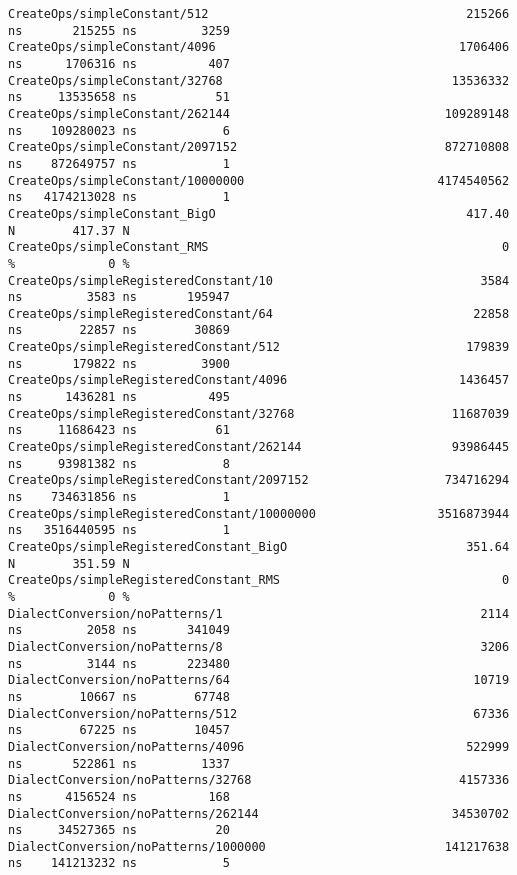 \begin{code}
\begin{verbatim}
CreateOps/simpleConstant/512                                    215266 ns       215255 ns         3259
CreateOps/simpleConstant/4096                                  1706406 ns      1706316 ns          407
CreateOps/simpleConstant/32768                                13536332 ns     13535658 ns           51
CreateOps/simpleConstant/262144                              109289148 ns    109280023 ns            6
CreateOps/simpleConstant/2097152                             872710808 ns    872649757 ns            1
CreateOps/simpleConstant/10000000                           4174540562 ns   4174213028 ns            1
CreateOps/simpleConstant_BigO                                   417.40 N        417.37 N
CreateOps/simpleConstant_RMS                                         0 %             0 %
CreateOps/simpleRegisteredConstant/10                             3584 ns         3583 ns       195947
CreateOps/simpleRegisteredConstant/64                            22858 ns        22857 ns        30869
CreateOps/simpleRegisteredConstant/512                          179839 ns       179822 ns         3900
CreateOps/simpleRegisteredConstant/4096                        1436457 ns      1436281 ns          495
CreateOps/simpleRegisteredConstant/32768                      11687039 ns     11686423 ns           61
CreateOps/simpleRegisteredConstant/262144                     93986445 ns     93981382 ns            8
CreateOps/simpleRegisteredConstant/2097152                   734716294 ns    734631856 ns            1
CreateOps/simpleRegisteredConstant/10000000                 3516873944 ns   3516440595 ns            1
CreateOps/simpleRegisteredConstant_BigO                         351.64 N        351.59 N
CreateOps/simpleRegisteredConstant_RMS                               0 %             0 %
DialectConversion/noPatterns/1                                    2114 ns         2058 ns       341049
DialectConversion/noPatterns/8                                    3206 ns         3144 ns       223480
DialectConversion/noPatterns/64                                  10719 ns        10667 ns        67748
DialectConversion/noPatterns/512                                 67336 ns        67225 ns        10457
DialectConversion/noPatterns/4096                               522999 ns       522861 ns         1337
DialectConversion/noPatterns/32768                             4157336 ns      4156524 ns          168
DialectConversion/noPatterns/262144                           34530702 ns     34527365 ns           20
DialectConversion/noPatterns/1000000                         141217638 ns    141213232 ns            5

\end{verbatim}
\end{code}
